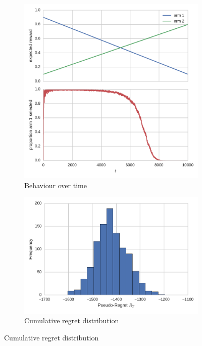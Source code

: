 \documentclass[11pt,a4paper,oneside]{book}
\theoremstyle{plain}
\theoremstyle{definition}
\begin{document}
\begin{figure}[h]
    \begin{subfigure}[t]{0.49\textwidth}
	\centering   
	 \caption{Behaviour over time}\label{fig:non-stationary-bandit-time} 
         \includegraphics[scale=.5]{non-stationary-bandit-time}
\end{subfigure}
    \begin{subfigure}[t]{0.49\textwidth}
    \centering
     \caption{Cumulative regret distribution}
        \label{fig:non-stationary-bandit-regret}
        \includegraphics[scale=.5]{non-stationary-bandit-regret}

\end{subfigure}
\end{figure}
\end{document}
